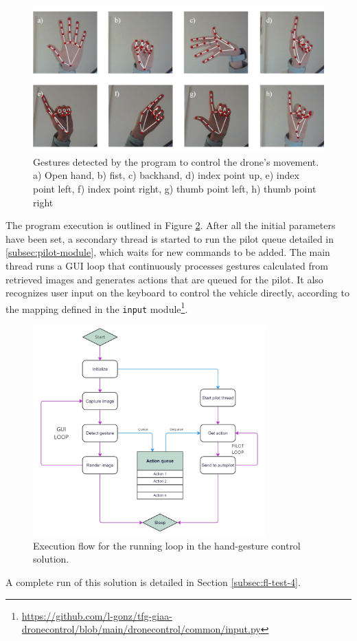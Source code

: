 \begin{figure}
  \centering
  \includegraphics[width=\textwidth, keepaspectratio]{img/hand-gestures.jpg}
  \caption{Gestures detected by the program to control the drone's movement. a) Open hand, b) fist, c) backhand, d) index point up, e) index point left, f) index point right, g) thumb point left, h) thumb point right}
  \label{fig:hand-gestures}
\end{figure}


The program execution is outlined in Figure \ref{fig:hands-loop}.
After all the initial parameters have been set, a secondary thread is started to run the pilot queue detailed in \ref{subsec:pilot-module}, which waits for new commands to be added.
The main thread runs a GUI loop that continuously processes gestures calculated from retrieved images and generates actions that are queued for the pilot.
It also recognizes user input on the keyboard to control the vehicle directly, according to the mapping defined in the \texttt{input} module\footnote{\url{https://github.com/l-gonz/tfg-giaa-dronecontrol/blob/main/dronecontrol/common/input.py}}.


\begin{figure}
  \centering
  \includegraphics[width=0.8\textwidth, keepaspectratio]{img/hand-loop.jpg}
  \caption{Execution flow for the running loop in the hand-gesture control solution.}
  \label{fig:hands-loop}
\end{figure}

A complete run of this solution is detailed in Section \ref{subsec:fl-test-4}.
